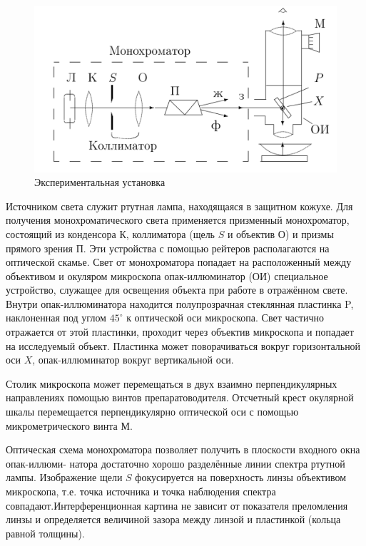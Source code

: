 \documentclass[a4paper,12pt]{article} %
\begin{document}
	\begin{figure} 
	\includegraphics[width=\linewidth]{lab}
	\caption{Экспериментальная установка}
	\label{lab}
\end{figure}

\medskip

\noindent Источником света служит ртутная лампа, находящаяся в защитном кожухе. Для получения монохроматического света применяется призменный монохроматор, состоящий из конденсора $ К $, коллиматора (щель $ S $ и объектив $ О $) и призмы прямого зрения $ П $. Эти устройства с помощью рейтеров располагаются на оптической скамье. Свет от монохроматора попадает на расположенный между объективом и окуляром микроскопа опак-иллюминатор (ОИ)  специальное устройство, служащее для освещения объекта при работе в отражённом свете. Внутри опак-иллюминатора находится полупрозрачная стеклянная пластинка P, наклоненная под углом $ 45^\circ $ к оптической оси микроскопа. Свет частично отражается от этой пластинки, проходит через объектив микроскопа и попадает на исследуемый объект. Пластинка может поворачиваться вокруг горизонтальной оси $ X $, опак-иллюминатор вокруг вертикальной оси.

\medskip

\noindent Столик микроскопа может перемещаться в двух взаимно перпендикулярных направлениях помощью винтов препаратоводителя. Отсчетный крест окулярной шкалы перемещается перпендикулярно оптической оси с помощью микрометрического винта $ М $.

\medskip
	
\noindent Оптическая схема монохроматора позволяет получить в плоскости входного окна опак-иллюми-
натора достаточно хорошо разделённые линии спектра ртутной лампы. Изображение щели $ S $ фокусируется на поверхность линзы объективом микроскопа, т.е. точка источника и точка наблюдения спектра совпадают.Интерференционная картина не зависит от показателя преломления линзы и определяется величиной зазора между линзой и пластинкой (кольца равной толщины).
\end{document}
